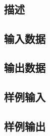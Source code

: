 \documentclass[UTF8]{ctexrep}
\begin{document}
\tt
{}
\fi


\section{}
\subsection*{描述}

\subsection*{输入数据}


\subsection*{输出数据}


\subsection*{样例输入}
\noindent 

\subsection*{样例输出}
\noindent 


\ifx\allfiles\undefined
\end{document}
